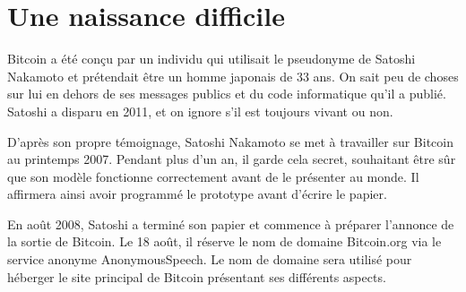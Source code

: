 \section*{Une naissance difficile}

Bitcoin a été conçu par un individu qui utilisait le pseudonyme de Satoshi Nakamoto et prétendait être un homme japonais de 33 ans. On sait peu de choses sur lui en dehors de ses messages publics et du code informatique qu'il a publié. Satoshi a disparu en 2011, et on ignore s'il est toujours vivant ou non.

D'après son propre témoignage, Satoshi Nakamoto se met à travailler sur Bitcoin au printemps 2007. Pendant plus d'un an, il garde cela secret, souhaitant être sûr que son modèle fonctionne correctement avant de le présenter au monde. Il affirmera ainsi avoir programmé le prototype avant d'écrire le papier. %

En août 2008, Satoshi a terminé son papier et commence à préparer l'annonce de la sortie de Bitcoin. Le 18 août, il réserve le nom de domaine Bitcoin.org via le service anonyme AnonymousSpeech. Le nom de domaine sera utilisé pour héberger le site principal de Bitcoin présentant ses différents aspects.

